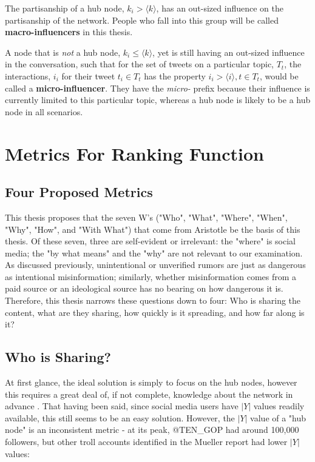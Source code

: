 \documentclass[preprint,review,12pt]{elsarticle}
\begin{document}
 The partisanship of a hub node, $k_i > \langle k \rangle$, has an out-sized influence on the partisanship of the network. People who fall into this group will be called \textbf{macro-influencers} in this thesis.
 
 A node that is \textit{not} a hub node, $k_i \leq \langle k \rangle$, yet is still having an out-sized influence in the conversation, such that for the set of tweets on a particular topic, $T_t$, the interactions, $i_i$ for their tweet $t_i \in T_t$ has the property $i_i > \langle i \rangle, t \in T_t$, would be called a \textbf{micro-influencer}. They have the \textit{micro-} prefix because their influence is currently limited to this particular topic, whereas a hub node is likely to be a hub node in all scenarios.

\section{Metrics For Ranking Function}
\subsection{Four Proposed Metrics}
This thesis proposes that the seven W's ("Who", "What", "Where", "When", "Why", "How", and "With What") that come from Aristotle \cite{sloan2010aristotle,aquinas1952thomas} be the basis of this thesis. Of these seven, three are self-evident or irrelevant: the "where" is social media; the "by what means" and the "why" are not relevant to our examination. As discussed previously, unintentional or unverified rumors are just as dangerous as intentional misinformation; similarly, whether misinformation comes from a paid source or an ideological source has no bearing on how dangerous it is. Therefore, this thesis narrows these questions down to four: Who is sharing the content, what are they sharing, how quickly is it spreading, and how far along is it?

\subsection{Who is Sharing?}
At first glance, the ideal solution is simply to focus on the hub nodes, however this requires a great deal of, if not complete, knowledge about the network in advance  \cite{dezsHo2002halting,pastor2002immunization}. That having been said, since social media users have $|Y|$ values readily available, this still seems to be an easy solution. However, the $|Y|$ value of a "hub node" is an inconsistent metric - at its peak, @TEN\_GOP had around 100,000 followers, but other troll accounts identified in the Mueller report had lower $|Y|$ values:
\end{document}
